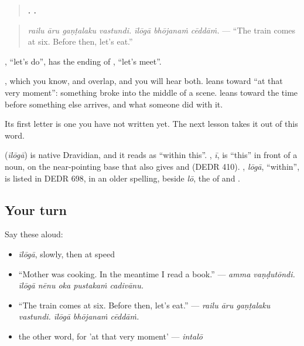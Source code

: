 \begin{quote}
\textbf{   .   .}
\end{quote}

\begin{quote}
\emph{railu āru gaṇṭalaku vastundi. īlōgā bhōjanaṁ cēddāṁ.} — \textquotedblleft{}The train comes at six. Before then, let's eat.\textquotedblright{}
\end{quote}

\textbf{}, \textquotedblleft{}let's do\textquotedblright{}, has the ending of \textbf{}, \textquotedblleft{}let's meet\textquotedblright{}.

\textbf{}, which you know, and \textbf{} overlap, and you will hear both. \textbf{} leans toward \textquotedblleft{}at that very moment\textquotedblright{}: something broke into the middle of a scene. \textbf{} leans toward the time before something else arrives, and what someone did with it.

Its first letter is one you have not written yet. The next lesson takes it out of this word.

\begin{cousinweb}
\textbf{} (\emph{īlōgā}) is native Dravidian, and it reads as \textquotedblleft{}within this\textquotedblright{}. \textbf{}, \emph{ī}, is \textquotedblleft{}this\textquotedblright{} in front of a noun, on the near-pointing base that also gives \textbf{} and \textbf{} (DEDR 410). \textbf{}, \emph{lōgā}, \textquotedblleft{}within\textquotedblright{}, is listed in DEDR 698, in an older spelling, beside \emph{lō}, the \textbf{} of \textbf{} and \textbf{}.
\end{cousinweb}

\subsection*{Your turn}
Say these aloud:

\begin{itemize}
\raggedright
  \item \emph{īlōgā}, slowly, then at speed
  \item \textquotedblleft{}Mother was cooking. In the meantime I read a book.\textquotedblright{} — \emph{amma vaṇḍutōndi. īlōgā nēnu oka pustakaṁ cadivānu.}
  \item \textquotedblleft{}The train comes at six. Before then, let's eat.\textquotedblright{} — \emph{railu āru gaṇṭalaku vastundi. īlōgā bhōjanaṁ cēddāṁ.}
  \item the other word, for 'at that very moment' — \emph{intalō}
\end{itemize}

